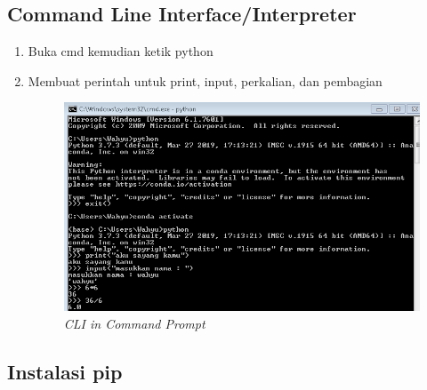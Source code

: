 \subsection{Command Line Interface/Interpreter}
\begin{enumerate}
\item Buka cmd kemudian ketik python
\item Membuat perintah untuk print, input, perkalian, dan pembagian

\begin{figure}[H]
    \centering
    \includegraphics[scale=0.5]{figures/a5}
    \caption{\textit{CLI in Command Prompt}}
    \label{CLI}
\end{figure}
\end{enumerate}

\subsection{Instalasi pip}

